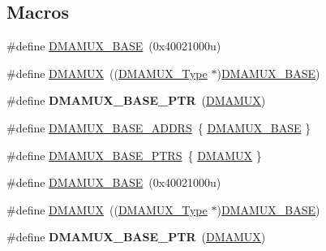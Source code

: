 \subsection*{Macros}
\begin{DoxyCompactItemize}
\item 
\#define \hyperlink{group__DMAMUX__Peripheral__Access__Layer_gab59b16200deae0e15cd58d322b7cc75b}{D\+M\+A\+M\+U\+X\+\_\+\+B\+A\+SE}~(0x40021000u)
\item 
\#define \hyperlink{group__DMAMUX__Peripheral__Access__Layer_ga0b7b7bd666a76aa791434bb59ea03693}{D\+M\+A\+M\+UX}~((\hyperlink{structDMAMUX__Type}{D\+M\+A\+M\+U\+X\+\_\+\+Type} $\ast$)\hyperlink{group__DMAMUX__Peripheral__Access__Layer_gab59b16200deae0e15cd58d322b7cc75b}{D\+M\+A\+M\+U\+X\+\_\+\+B\+A\+SE})
\item 
\#define {\bfseries D\+M\+A\+M\+U\+X\+\_\+\+B\+A\+S\+E\+\_\+\+P\+TR}~(\hyperlink{group__DMAMUX__Peripheral__Access__Layer_ga0b7b7bd666a76aa791434bb59ea03693}{D\+M\+A\+M\+UX})\hypertarget{group__DMAMUX__Peripheral__Access__Layer_gad38c261e5de04658dbad762d40e8904e}{}\label{group__DMAMUX__Peripheral__Access__Layer_gad38c261e5de04658dbad762d40e8904e}

\item 
\#define \hyperlink{group__DMAMUX__Peripheral__Access__Layer_ga829aeb2ec17eff9c9fa684315a70bc2a}{D\+M\+A\+M\+U\+X\+\_\+\+B\+A\+S\+E\+\_\+\+A\+D\+D\+RS}~\{ \hyperlink{group__DMAMUX__Peripheral__Access__Layer_gab59b16200deae0e15cd58d322b7cc75b}{D\+M\+A\+M\+U\+X\+\_\+\+B\+A\+SE} \}
\item 
\#define \hyperlink{group__DMAMUX__Peripheral__Access__Layer_gaad218c12978071501dc2899f0624de4b}{D\+M\+A\+M\+U\+X\+\_\+\+B\+A\+S\+E\+\_\+\+P\+T\+RS}~\{ \hyperlink{group__DMAMUX__Peripheral__Access__Layer_ga0b7b7bd666a76aa791434bb59ea03693}{D\+M\+A\+M\+UX} \}
\item 
\#define \hyperlink{group__DMAMUX__Peripheral__Access__Layer_gab59b16200deae0e15cd58d322b7cc75b}{D\+M\+A\+M\+U\+X\+\_\+\+B\+A\+SE}~(0x40021000u)
\item 
\#define \hyperlink{group__DMAMUX__Peripheral__Access__Layer_ga0b7b7bd666a76aa791434bb59ea03693}{D\+M\+A\+M\+UX}~((\hyperlink{structDMAMUX__Type}{D\+M\+A\+M\+U\+X\+\_\+\+Type} $\ast$)\hyperlink{group__DMAMUX__Peripheral__Access__Layer_gab59b16200deae0e15cd58d322b7cc75b}{D\+M\+A\+M\+U\+X\+\_\+\+B\+A\+SE})
\item 
\#define {\bfseries D\+M\+A\+M\+U\+X\+\_\+\+B\+A\+S\+E\+\_\+\+P\+TR}~(\hyperlink{group__DMAMUX__Peripheral__Access__Layer_ga0b7b7bd666a76aa791434bb59ea03693}{D\+M\+A\+M\+UX})\hypertarget{group__DMAMUX__Peripheral__Access__Layer_gad38c261e5de04658dbad762d40e8904e}{}\label{group__DMAMUX__Peripheral__Access__Layer_gad38c261e5de04658dbad762d40e8904e}


\end{DoxyCompactItemize}
